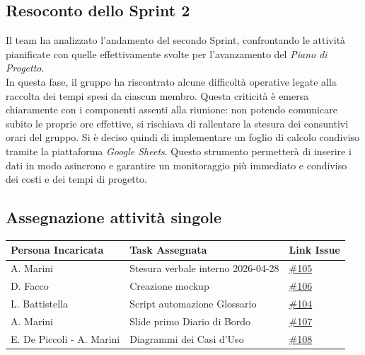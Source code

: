 \documentclass[a4paper, 10pt, colorlinks=true, linkcolor=black, urlcolor=blue, citecolor=blue, hidelinks]{article}
\newcommand{\issue}[1]{\href{https://github.com/thebitless-group-swe/thebitless.github.io/issues/#1}{\##1}}
\begin{document}
\subsection{Resoconto dello Sprint 2}
Il team ha analizzato l'andamento del secondo Sprint, confrontando le attività pianificate con quelle effettivamente svolte per l'avanzamento del \textit{Piano di Progetto}. \\
In questa fase, il gruppo ha riscontrato alcune difficoltà operative legate alla raccolta dei tempi spesi da ciascun membro. Questa criticità è emersa chiaramente con i componenti assenti alla riunione: non potendo comunicare subito le proprie ore effettive, si rischiava di rallentare la stesura dei consuntivi orari del gruppo. Si è deciso quindi di implementare un foglio di calcolo condiviso tramite la piattaforma \textit{Google Sheets}. Questo strumento permetterà di inserire i dati in modo asincrono e garantire un monitoraggio più immediato e condiviso dei costi e dei tempi di progetto.

\subsection{Assegnazione attività singole}
\begin{center}
    \renewcommand{\arraystretch}{1.4}
        \begin{tabular}{|p{4.2cm}|p{6.2cm}|p{2.2cm}|}
        \hline
        \textbf{Persona Incaricata} & \textbf{Task Assegnata} & \centering\textbf{Link Issue} \tabularnewline
        \hline
        A. Marini & Stesura verbale interno 2026-04-28 & \issue{105} \\
        \hline
        D. Facco & Creazione mockup & \issue{106} \\
        \hline
        L. Battistella & Script automazione Glossario & \issue{104} \\
        \hline
        A. Marini & Slide primo Diario di Bordo & \issue{107} \\
        \hline
        E. De Piccoli - A. Marini & Diagrammi dei Casi d'Uso & \issue{108}  \\
        \hline
    \end{tabular}
\end{center}

\appendix
\end{document}
